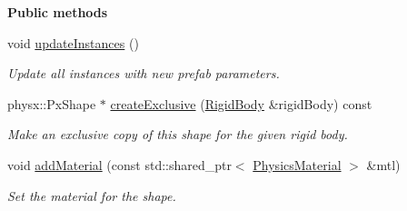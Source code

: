\begin{Indent}\textbf{ Public methods}\par
\begin{DoxyCompactItemize}
\item 
\mbox{\label{classrev_1_1_physics_shape_prefab_a5470417c197ffb57d0882dbcbdbb2071}} 
void \mbox{\hyperlink{classrev_1_1_physics_shape_prefab_a5470417c197ffb57d0882dbcbdbb2071}{update\+Instances}} ()
\begin{DoxyCompactList}\small\item\em Update all instances with new prefab parameters. \end{DoxyCompactList}\item 
\mbox{\label{classrev_1_1_physics_shape_prefab_a384a7f6830058ef53dc9a20c78609e2b}} 
physx\+::\+Px\+Shape $\ast$ \mbox{\hyperlink{classrev_1_1_physics_shape_prefab_a384a7f6830058ef53dc9a20c78609e2b}{create\+Exclusive}} (\mbox{\hyperlink{classrev_1_1_rigid_body}{Rigid\+Body}} \&rigid\+Body) const
\begin{DoxyCompactList}\small\item\em Make an exclusive copy of this shape for the given rigid body. \end{DoxyCompactList}\item 
\mbox{\label{classrev_1_1_physics_shape_prefab_a2ace480396213886b7e2523adea65f70}} 
void \mbox{\hyperlink{classrev_1_1_physics_shape_prefab_a2ace480396213886b7e2523adea65f70}{add\+Material}} (const std\+::shared\+\_\+ptr$<$ \mbox{\hyperlink{classrev_1_1_physics_material}{Physics\+Material}} $>$ \&mtl)
\begin{DoxyCompactList}\small\item\em Set the material for the shape. \end{DoxyCompactList}\end{DoxyCompactItemize}
\end{Indent}
